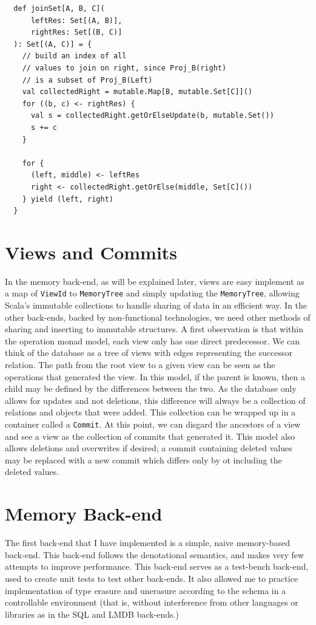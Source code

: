 \documentclass[12pt,a4paper,twoside,openright]{report}
\newcommand\codeName[1]{\texttt{#1}}
\renewcommand{\baselinestretch}{1.1}    %
\begin{document}
\renewcommand{\baselinestretch}{0.8}
\begin{framed}
\begin{verbatim}
  def joinSet[A, B, C](
      leftRes: Set[(A, B)],
      rightRes: Set[(B, C)]
  ): Set[(A, C)] = {
    // build an index of all 
    // values to join on right, since Proj_B(right)
    // is a subset of Proj_B(Left)
    val collectedRight = mutable.Map[B, mutable.Set[C]]()
    for ((b, c) <- rightRes) {
      val s = collectedRight.getOrElseUpdate(b, mutable.Set())
      s += c
    }
    
    for {
      (left, middle) <- leftRes
      right <- collectedRight.getOrElse(middle, Set[C]())
    } yield (left, right)
  }
\end{verbatim}
\end{framed}
\renewcommand{\baselinestretch}{1.1}

\section{Views and Commits}
In the memory back-end, as will be explained later, views are easy implement as a map of \codeName{ViewId} to \codeName{MemoryTree} and simply updating the \codeName{MemoryTree}, allowing Scala's immutable collections to handle sharing of data in an efficient way. In the other back-ends, backed by non-functional technologies, we need other methods of sharing and inserting to immutable structures. A first observation is that within the operation monad model, each view only has one direct predecessor. We can think of the database as a tree of views with edges representing the successor relation. The path from the root view to a given view can be seen as the operations that generated the view. In this model, if the parent is known, then a child may be defined by the differences between the two. As the database only allows for updates and not deletions, this difference will always be a collection of relations and objects that were added. This collection can be wrapped up in a container called a \codeName{Commit}. At this point, we can disgard the ancestors of a view and see a view as the collection of commits that generated it. This model also allows deletions and overwrites if desired; a commit containing deleted values may be replaced with a new commit which differs only by ot including the deleted values.

\section{Memory Back-end}
The first back-end that I have implemented is a simple, naive memory-based back-end. This back-end follows the denotational semantics, and makes very few attempts to improve performance. This back-end serves as a test-bench back-end, used to create unit tests to test other back-ends. It also allowed me to practice implementation of type erasure and unerasure according to the schema in a controllable environment (that is, without interference from other languages or libraries as in the SQL and LMDB back-ends.)
\end{document}

